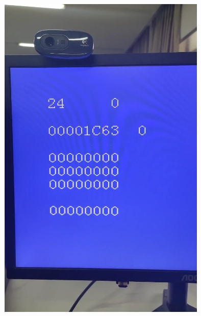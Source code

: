 \documentclass[12pt,hyperref,a4paper,UTF8]{ctexart}
\begin{document}
\begin{figure}[H]
\begin{minipage}[b]{0.24\textwidth}
        \includegraphics[width=\textwidth]{figures/fig/fram2.png}
    \end{minipage}
    \begin{minipage}[b]{0.24\textwidth}
        \centering

\end{minipage}
\end{figure}
\end{document}
